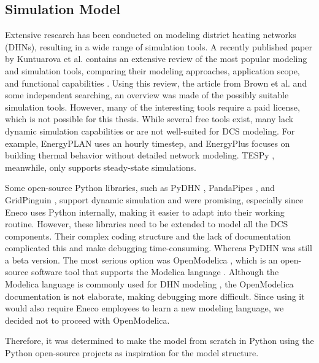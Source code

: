 \subsection{Simulation Model}
Extensive research has been conducted on modeling district heating networks (DHNs), resulting in a wide range of simulation tools. A recently published paper by Kuntuarova et al. contains an extensive review of the most popular modeling and simulation tools, comparing their modeling approaches, application scope, and functional capabilities \cite{KUNTUAROVA}. Using this review, the article from Brown et al. \cite{BROWN2022125060} and some independent searching, an overview was made of the possibly suitable simulation tools. However, many of the interesting tools require a paid license, which is not possible for this thesis. While several free tools exist, many lack dynamic simulation capabilities or are not well-suited for DCS modeling. For example, EnergyPLAN \cite{EnergyPlan} uses an hourly timestep, and EnergyPlus \cite{EnergyPlus} focuses on building thermal behavior without detailed network modeling. TESPy \cite{TESPy}, meanwhile, only supports steady-state simulations.

Some open-source Python libraries, such as PyDHN \cite{PyDHN}, PandaPipes \cite{pandapipes}, and GridPinguin \cite{GridPenguin}, support dynamic simulation and were promising, especially since Eneco uses Python internally, making it easier to adapt into their working routine. However, these libraries need to be extended to model all the DCS components. Their complex coding structure and the lack of documentation complicated this and make debugging time-consuming. Whereas PyDHN was still a beta version. The most serious option was OpenModelica \cite{OpenModelica}, which is an open-source software tool that supports the Modelica language \cite{Modelica}. Although the Modelica language is commonly used for DHN modeling \cite{KUNTUAROVA}, the OpenModelica documentation is not elaborate, making debugging more difficult. Since using it would also require Eneco employees to learn a new modeling language, we decided not to proceed with OpenModelica.  

Therefore, it was determined to make the model from scratch in Python using the Python open-source projects as inspiration for the model structure.


